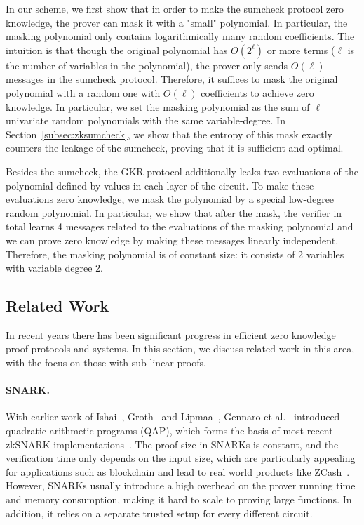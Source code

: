 In our scheme, we first show that in order to make the sumcheck protocol zero knowledge, the prover can mask it with a "small" polynomial. In particular, the masking polynomial only contains logarithmically many random coefficients. The intuition is that though the original polynomial has $O(2^\ell)$ or more terms ($\ell$ is the number of variables in the polynomial), the prover only sends $O(\ell)$ messages in the sumcheck protocol. Therefore, it suffices to mask the original polynomial with a random one with $O(\ell)$ coefficients to achieve zero knowledge. In particular, we set the masking polynomial as the sum of $\ell$ univariate random polynomials with the same variable-degree. In Section~\ref{subsec:zksumcheck}, we show that the entropy of this mask exactly counters the leakage of the sumcheck, proving that it is sufficient and optimal.

Besides the sumcheck, the GKR protocol additionally leaks two evaluations of the polynomial defined by values in each layer of the circuit. To make these evaluations zero knowledge, we mask the polynomial by a special low-degree random polynomial. In particular, we show that after the mask, the verifier in total learns 4 messages related to the evaluations of the masking polynomial and we can prove zero knowledge by making these messages linearly independent. Therefore, the masking polynomial is of constant size: it consists of 2 variables with variable degree 2.


\subsection{Related Work}\label{subsec::related}

 In recent years there has been significant progress in efficient zero knowledge proof protocols and systems. In this section, we discuss related work in this area, with the focus on those with sub-linear proofs. 

\paragraph{SNARK.} With earlier work of Ishai~\cite{IshaiKO07}, Groth~\cite{groth2010short} and Lipmaa~\cite{lipmaa2012progression}, Gennaro et al.~\cite{GGPR13} introduced quadratic arithmetic programs (QAP), which forms the basis of most recent zkSNARK implementations~\cite{parno2013pinocchio,ben2013snarks,braun13,libsnark,ben2014scalable,geppetto,DBLP:conf/eurocrypt/ChiesaTV15,wahby2015efficient,Fiore16,wu2018dizk}. The proof size in SNARKs is constant, and the verification time only depends on the input size, which are particularly appealing for applications such as blockchain and lead to real world products like ZCash~\cite{zerocash}. However, SNARKs usually introduce a high overhead on the prover running time and memory consumption, making it hard to scale to proving large functions. In addition, it relies on a separate trusted setup for every different circuit. 

